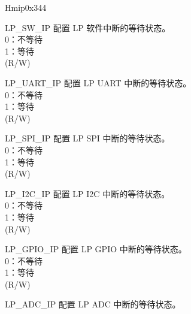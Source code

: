 \begin{register}{H}{mip}{0x344}\label{regdesc:LPMIP}
%
%
%
%
%
%
%
%
%
%
%
%
%
%
%
%
%
%
%
%
%
%
%
\regnewline%
\begin{regdesc}\begin{reglist}
\label{fielddesc:LPMIPLPSWIP}\item [LP\_SW\_IP] 配置 LP 软件中断的等待状态。\\
0：不等待\\
1：等待\\
(R/W)
\label{fielddesc:LPMIPLPUARTIP}\item [LP\_UART\_IP] 配置 LP UART 中断的等待状态。\\
0：不等待\\
1：等待\\ (R/W)
\label{fielddesc:LPMIPLPSPIIP}\item [LP\_SPI\_IP] 配置 LP SPI 中断的等待状态。\\
0：不等待\\
1：等待\\ (R/W)
\label{fielddesc:LPMIPI2CIP}\item [LP\_I2C\_IP] 配置 LP I2C 中断的等待状态。\\
0：不等待\\
1：等待\\(R/W)
\label{fielddesc:LPMIPGPIOIP}\item [LP\_GPIO\_IP] 配置 LP GPIO 中断的等待状态。\\
0：不等待\\
1：等待\\(R/W)
\label{fielddesc:LPMIPADCIP}\item [LP\_ADC\_IP] 配置 LP ADC 中断的等待状态。\\

\end{reglist}
\end{regdesc}
\end{register}
